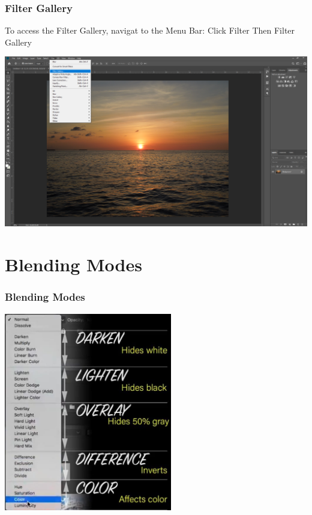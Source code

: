 \documentclass{beamer}
\begin{document}
\begin{frame}
	\frametitle{Filter Gallery}
	\begin{outline}
		\1 To access the Filter Gallery, navigat to the Menu Bar:
		\2 Click Filter
		\2 Then Filter Gallery
	\end{outline}
	\begin{center}
		\includegraphics[width = 1.0\textwidth]{images/get to filter gallery.png}
	\end{center}
\end{frame}
	
	
	\section{Blending Modes}
	\begin{frame}
		\frametitle{Blending Modes}
		\begin{center}
			\includegraphics[width = 0.55\textwidth]{images/blending modes 2.jpg}
		\end{center}
	\end{frame}
	
\end{document}
